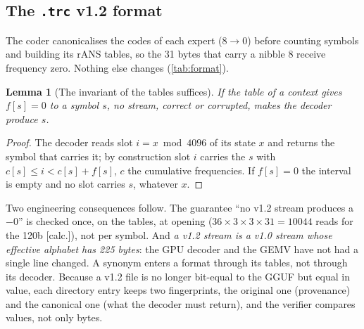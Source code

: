 \documentclass[11pt, a4paper]{article}
\newtheorem{lemma}[proposition]{Lemma}
\theoremstyle{remark}
\newcommand{\etiq}[1]{\textsf{\scriptsize[#1]}}
\newcommand{\calc}{\etiq{calc.}}
\begin{document}
\subsection{The \texttt{.trc} v1.2 format}\label{sec:format}

The coder canonicalises the codes of each expert ($8 \to 0$) before counting symbols and building its rANS tables, so the 31 bytes that carry a nibble 8 receive frequency zero. Nothing else changes (\cref{tab:format}).

\begin{lemma}[The invariant of the tables suffices]\label{lem:tables}
If the table of a context gives $f[s] = 0$ to a symbol $s$, no stream, correct or corrupted, makes the decoder produce $s$.
\end{lemma}
\begin{proof}
The decoder reads slot $i = x \bmod 4096$ of its state $x$ and returns the symbol that carries it; by construction slot $i$ carries the $s$ with $c[s] \le i < c[s] + f[s]$, $c$ the cumulative frequencies. If $f[s] = 0$ the interval is empty and no slot carries $s$, whatever $x$.
\end{proof}

Two engineering consequences follow. The guarantee ``no v1.2 stream produces a $-0$'' is checked once, on the tables, at opening ($36 \times 3 \times 3 \times 31 = \num{10044}$ reads for the 120b \calc), not per symbol. And \emph{a v1.2 stream is a v1.0 stream whose effective alphabet has 225 bytes}: the GPU decoder and the GEMV have not had a single line changed. A synonym enters a format through its tables, not through its decoder. Because a v1.2 file is no longer bit-equal to the GGUF but equal in value, each directory entry keeps two fingerprints, the original one (provenance) and the canonical one (what the decoder must return), and the verifier compares values, not only bytes.
\end{document}
